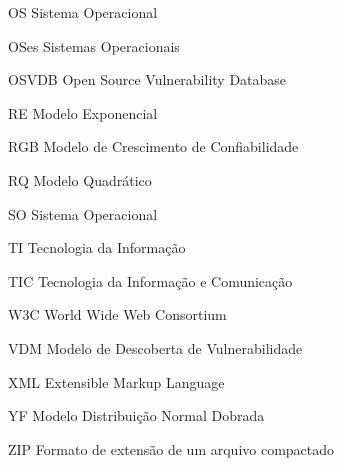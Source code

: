 \begin{siglas}
    \item[OS] Sistema Operacional
    \item[OSes] Sistemas Operacionais
    \item[OSVDB] Open Source Vulnerability Database
	
	
	
    \item[RE] Modelo Exponencial
    \item[RGB] Modelo de Crescimento de Confiabilidade
    \item[RQ] Modelo Quadrático
	
	\item[SO] Sistema Operacional
    
    \item[TI] Tecnologia da Informação
	\item[TIC] Tecnologia da Informação e Comunicação
    
	
	\item[W3C] World Wide Web Consortium

    \item[VDM] Modelo de Descoberta de Vulnerabilidade
	
	\item[XML] Extensible Markup Language
    \item[YF] Modelo Distribuição Normal Dobrada
	
	\item[ZIP] Formato de extensão de um arquivo compactado

\end{siglas}


